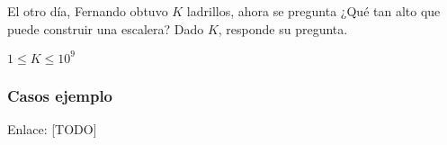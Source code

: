 El otro día, Fernando obtuvo \(K\) ladrillos, ahora se pregunta ¿Qué tan alto que puede construir una escalera? Dado \(K\), responde su pregunta.

\begin{plimits}
	\item \(1\leq K \leq 10^9\)
\end{plimits}

\subsubsection{Casos ejemplo}
\begin{casebox2}
\end{casebox2}

Enlace: [TODO]
